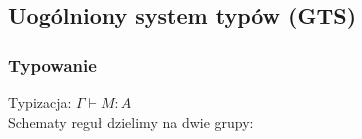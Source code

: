 \subsection{Uogólniony system typów (GTS)}
  \subsubsection{Typowanie}
  Typizacja: \(\Gamma \vdash M : A\)\\

  Schematy reguł dzielimy na dwie grupy:


